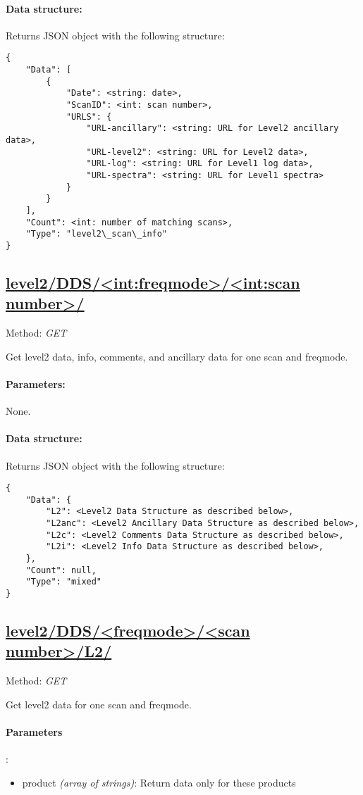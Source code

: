 \paragraph{Data structure:}
Returns JSON object with the following structure:

\begin{lstlisting}
{
	"Data": [
		{
			"Date": <string: date>,
			"ScanID": <int: scan number>,
			"URLS": {
				"URL-ancillary": <string: URL for Level2 ancillary data>,
				"URL-level2": <string: URL for Level2 data>,
				"URL-log": <string: URL for Level1 log data>,
				"URL-spectra": <string: URL for Level1 spectra>
			}
		}
	],
	"Count": <int: number of matching scans>,
	"Type": "level2\_scan\_info"
}
\end{lstlisting}


\subsection{\url{level2/DDS/<int:freqmode>/<int:scan number>/}}
Method: \emph{GET}

Get level2 data, info, comments, and ancillary data for one scan and freqmode.

\paragraph{Parameters:} None.

\paragraph{Data structure:}
Returns JSON object with the following structure:

\begin{lstlisting}
{
	"Data": {
		"L2": <Level2 Data Structure as described below>,
		"L2anc": <Level2 Ancillary Data Structure as described below>,
		"L2c": <Level2 Comments Data Structure as described below>,
		"L2i": <Level2 Info Data Structure as described below>,
	},
	"Count": null,
	"Type": "mixed"
}
\end{lstlisting}


\subsection{\url{level2/DDS/<freqmode>/<scan number>/L2/}}
Method: \emph{GET}

Get level2 data for one scan and freqmode.

\paragraph{Parameters}:
\begin{itemize}
    \item product \emph{(array of strings)}: Return data only for these
        products
\end{itemize}

